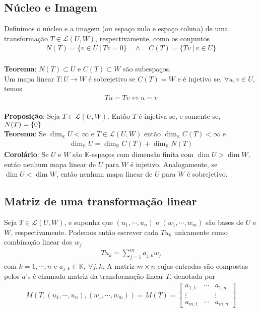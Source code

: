 \documentclass{article}
\newcommand{\K}{\mathbb{K}}
\renewcommand{\L}{\mathcal{L}}
\begin{document}
\subsection{Núcleo e Imagem}

Definimos o núcleo e a imagem (ou espaço nulo e espaço coluna) de uma transformação $T \in \L(U,W)$, respectivamente, como os conjuntos
\begin{align*}
    N(T) = \{ v \in U \: | \: Tv = 0 \} \quad \land \quad C(T) = \{ Tv \: | \: v \in U \}
\end{align*} \\
\textbf{Teorema}: $N(T) \subset U$ e $C(T) \subset W$ são subespaços. \vspace{3mm} \\
Um mapa linear $T: U \to W$ é sobrejetivo se $C(T) = W$ e é injetivo se, $\forall u, v \in U$, temos
\begin{align*}
    Tu = Tv \iff u = v
\end{align*} \\
\textbf{Proposição}: Seja $T \in \L(U,W)$. Então $T$ é injetiva se, e somente se, $N(T) = \nolinebreak\{0\}$ \vspace{3mm} \\
\textbf{Teorema}: Se $\dim_{\K} U < \infty$ e $T \in \L(U,W)$ então $\dim_{\K} C(T) < \infty$ e
\begin{align*}
    \dim_{\K} U = \dim_{\K} C(T) + \dim_{\K} N(T) 
\end{align*}
\textbf{Corolário}: Se $U$ e $W$ são $\K$-espaços com dimensão finita com $\dim U > \dim W$, então nenhum mapa linear de $U$ para $W$ é injetivo. Analogamente, se \linebreak $\dim U < \dim W$, então nenhum mapa linear de $U$ para $W$ é sobrejetivo.

\subsection{Matriz de uma transformação linear}

Seja $T \in \mathcal{L}(U,W)$, e suponha que $(u_1,\cdots,u_n)$ e $(w_1,\cdots,w_m)$ são bases de $U$ e $W$, respectivamente. Podemos então escrever cada $Tu_k$ unicamente como combinação linear dos $w_j$
\begin{align*}
    Tu_k = \sum_{j=1}^m a_{j,k}w_j
\end{align*}
com $k = 1,\cdots,n$ e $a_{j,k} \in \K,\:\forall j,k$. A matriz $m \times n$ cujas entradas são compostas pelos $a$'s é chamada matriz da transformação linear $T$, denotada por
\begin{align*}
    M(T,(u_1,\cdots,u_n),(w_1,\cdots,w_m)) = M(T) =
    \begin{bmatrix}
        a_{1,1} & \cdots & a_{1,n} \\
        \vdots & & \vdots \\
        a_{m,1} & \cdots & a_{m,n}
    \end{bmatrix}
\end{align*}
\end{document}
